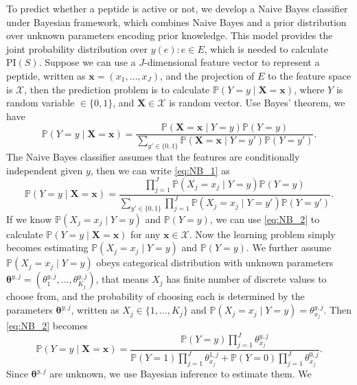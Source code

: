 \documentclass[11pt]{article}
\newcommand{\Prob}{\mathbb{P}}
\newcommand{\PI}{\text{PI}}
\begin{document}
To predict whether a peptide is active or not, we develop a Naive Bayes classifier 
under Bayesian framework, which combines Naive Bayes and a prior distribution over
unknown parameters encoding prior knowledge. This model provides the joint probability
distribution over $y(e): e \in E$, which is needed to calculate $\PI(S)$. Suppose we 
can use a $J$-dimensional feature vector to represent a peptide, written as
$\bm{x} = (x_1, \ldots, x_J)$, and the projection of $E$ to the feature space is
$\mathcal{X}$, then the prediction problem is to calculate
$\Prob (Y = y \mid \bm{X} = \bm{x})$, where $Y$ is random variable $\in \{0, 1\}$,
and $\bm{X} \in \mathcal{X}$ is random vector. Use Bayes' theorem, we have
\begin{equation}
  \Prob(Y = y \mid \bm{X} = \bm{x}) = \frac{\Prob(\bm{X} = \bm{x} \mid Y = y) \Prob(Y = y)}{\sum_{y' \in \{0, 1\}} \Prob(\bm{X}= \bm{x} \mid Y = y') \Prob(Y = y')}.
  \label{eq:NB_1}
\end{equation}
The Naive Bayes classifier assumes that the features are conditionally independent 
given $y$, then we can write \eqref{eq:NB_1} as 
\begin{equation}
  \Prob(Y = y \mid \bm{X} = \bm{x}) = \frac{\prod_{j = 1}^J \Prob(X_j = x_j \mid Y = y) \Prob(Y = y)}{\sum_{y' \in \{0, 1\}} \prod_{j = 1}^J \Prob(X_j = x_j \mid Y = y') \Prob(Y = y')}.
  \label{eq:NB_2}
\end{equation}
If we know $\Prob(X_j = x_j \mid Y = y)$ and $\Prob(Y = y)$, we can use \eqref{eq:NB_2} 
to calculate $\Prob(Y = y \mid \bm{X} = \bm{x})$ for any $\bm{x} \in \mathcal{X}$. Now the learning
problem simply becomes estimating $\Prob(X_j = x_j \mid Y = y)$ and $\Prob(Y = y)$.
We further assume $\Prob(X_j = x_j \mid Y = y)$ obeys categorical distribution with
unknown parameters $\bm{\theta}^{y, j} = (\theta^{y, j}_1, \ldots, \theta^{y, j}_{K_j})$,
that means $X_j$ has finite number of discrete values to choose from, and the probability
of choosing each is determined by the parameters $\bm{\theta}^{y, j}$, written as
$X_j \in \{1, \ldots, K_j\}$ and $\Prob(X_j = x_j \mid Y = y) = \theta^{y, j}_{x_j}$.
Then \eqref{eq:NB_2} becomes
\begin{equation}
  \Prob (Y = y \mid \bm{X} = \bm{x}) = \frac{\Prob(Y = y) \prod_{j=1}^J \theta^{y, j}_{x_j}}
  {\Prob(Y = 1) \prod_{j=1}^J \theta^{1,j}_{x_j} + \Prob(Y = 0) \prod_{j=1}^J \theta^{0,j}_{x_j}}.
  \label{eq:NB_3}
\end{equation}
Since $\bm{\theta}^{y, j}$ are unknown, we use Bayesian inference to estimate them. We 
\end{document}
